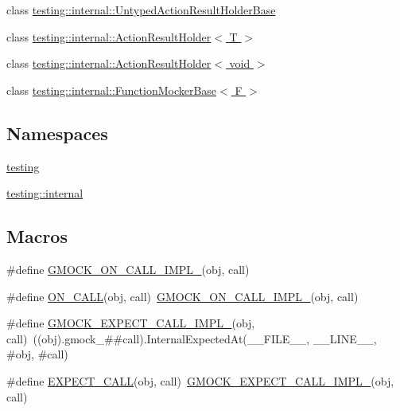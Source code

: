 \begin{DoxyCompactItemize}
\item 
class \hyperlink{classtesting_1_1internal_1_1UntypedActionResultHolderBase}{testing\+::internal\+::\+Untyped\+Action\+Result\+Holder\+Base}
\item 
class \hyperlink{classtesting_1_1internal_1_1ActionResultHolder}{testing\+::internal\+::\+Action\+Result\+Holder$<$ T $>$}
\item 
class \hyperlink{classtesting_1_1internal_1_1ActionResultHolder_3_01void_01_4}{testing\+::internal\+::\+Action\+Result\+Holder$<$ void $>$}
\item 
class \hyperlink{classtesting_1_1internal_1_1FunctionMockerBase}{testing\+::internal\+::\+Function\+Mocker\+Base$<$ F $>$}
\end{DoxyCompactItemize}
\subsection*{Namespaces}
\begin{DoxyCompactItemize}
\item 
 \hyperlink{namespacetesting}{testing}
\item 
 \hyperlink{namespacetesting_1_1internal}{testing\+::internal}
\end{DoxyCompactItemize}
\subsection*{Macros}
\begin{DoxyCompactItemize}
\item 
\#define \hyperlink{gmock-spec-builders_8h_a7c47d936dcf489ac84c046740aea777e}{G\+M\+O\+C\+K\+\_\+\+O\+N\+\_\+\+C\+A\+L\+L\+\_\+\+I\+M\+P\+L\+\_\+}(obj,  call)
\item 
\#define \hyperlink{gmock-spec-builders_8h_a5b12ae6cf84f0a544ca811b380c37334}{O\+N\+\_\+\+C\+A\+LL}(obj,  call)~\hyperlink{gmock-spec-builders_8h_a7c47d936dcf489ac84c046740aea777e}{G\+M\+O\+C\+K\+\_\+\+O\+N\+\_\+\+C\+A\+L\+L\+\_\+\+I\+M\+P\+L\+\_\+}(obj, call)
\item 
\#define \hyperlink{gmock-spec-builders_8h_ae261d723ebfab24d5831030d320f526c}{G\+M\+O\+C\+K\+\_\+\+E\+X\+P\+E\+C\+T\+\_\+\+C\+A\+L\+L\+\_\+\+I\+M\+P\+L\+\_\+}(obj,  call)~((obj).gmock\+\_\+\#\#call).Internal\+Expected\+At(\+\_\+\+\_\+\+F\+I\+L\+E\+\_\+\+\_\+, \+\_\+\+\_\+\+L\+I\+N\+E\+\_\+\+\_\+, \#obj, \#call)
\item 
\#define \hyperlink{gmock-spec-builders_8h_a535a6156de72c1a2e25a127e38ee5232}{E\+X\+P\+E\+C\+T\+\_\+\+C\+A\+LL}(obj,  call)~\hyperlink{gmock-spec-builders_8h_ae261d723ebfab24d5831030d320f526c}{G\+M\+O\+C\+K\+\_\+\+E\+X\+P\+E\+C\+T\+\_\+\+C\+A\+L\+L\+\_\+\+I\+M\+P\+L\+\_\+}(obj, call)
\end{DoxyCompactItemize}
